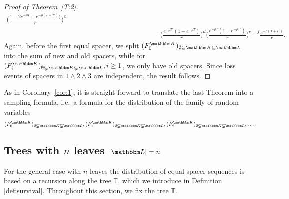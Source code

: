 \documentclass[preprint,authoryear]{elsarticle}
\theoremstyle{definition}
\numberwithin{equation}{section}
\numberwithin{figure}{section}
\begin{document}
\begin{proof}[Proof of Theorem~\ref{T:2}]
\begin{align*}
        \Big(\frac{1-2e^{-\rho T} + e^{-\rho (T+T')})}{r}\Big)^{c}
    \\ & \qquad\qquad \qquad\qquad \qquad\qquad
         \cdot \Big(\frac{e^{-\rho T'}(1- e^{-\rho T})}{r}\Big)^{d}
         \Big(\frac{e^{-\rho T}(1- e^{-\rho T'})}{r}\Big)^{e+f}
         \frac{e^{-\rho (T+T')}}{r}.
  \end{align*}
  Again, before the first equal spacer, we split
  $(F_0^{\mathbbm K})_{\emptyset \subsetneq \mathbbm K\subsetneq
    \mathbbm L}$
  into the sum of new and old spacers, while for
  $(F_i^{\mathbbm K})_{\emptyset \subsetneq \mathbbm K\subsetneq
    \mathbbm L}, i\geq 1$,
  we only have old spacers. Since loss events of spacers in
  $\mathfrak 1\wedge \mathfrak 2\wedge \mathfrak 3$ are independent,
  the result follows.
\end{proof}

As in Corollary~\ref{cor:1}, it is straight-forward to translate the
last Theorem into a sampling formula, i.e.\ a formula for the
distribution of the family of random variables
$$ (F_0^{\mathbbm K})_{\emptyset \subsetneq \mathbbm K\subsetneq \mathbbm L}, 
(F_1^{\mathbbm K})_{\emptyset \subsetneq \mathbbm K\subsetneq \mathbbm
  L}, (F_2^{\mathbbm K})_{\emptyset \subsetneq \mathbbm K\subsetneq
  \mathbbm L},\dots$$



\subsection[Trees with $n$ leaves]{Trees with $n$ leaves $|\mathbbm L|=n$}
For the general case with $n$ leaves the distribution of equal spacer
sequences is based on a recursion along the tree $\mathbb T$, which we
introduce in Definition \ref{def:survival}. Throughout this section, we fix the
tree $\mathbb T$.
\end{document}
